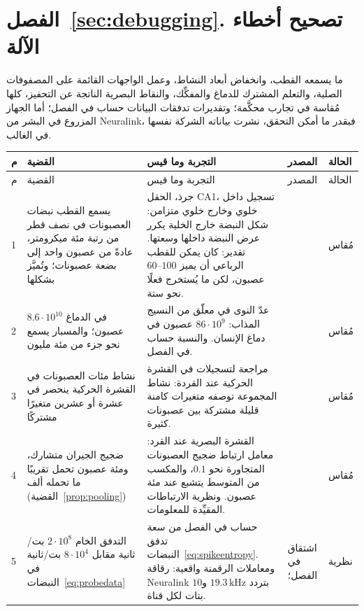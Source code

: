\section{الفصل~\ref{sec:debugging}. تصحيح أخطاء الآلة}

ما يسمعه القطب، وانخفاض أبعاد النشاط، وعمل الواجهات القائمة على المصفوفات الصلبة، والتعلم المشترك للدماغ والمفكِّك، والنقاط البصرية الناتجة عن التحفيز، كلها مُقاسة في تجارب محكَّمة؛ وتقديرات تدفقات البيانات حساب في الفصل؛ أما الجهاز المزروع في البشر من \foreignlanguage{english}{Neuralink}، فبقدر ما أمكن التحقق، نشرت بياناته الشركة نفسها في الغالب.

{\footnotesize
\setlength{\tabcolsep}{3pt}\renewcommand{\arraystretch}{1.15}
\begin{longtable}{>{\raggedright}p{0.5cm}>{\raggedright}p{4.0cm}>{\raggedright}p{5.6cm}>{\raggedright}p{2.3cm}>{\raggedright\arraybackslash}p{1.7cm}}
\toprule
م & القضية & التجربة وما قيس & المصدر & الحالة \\
\midrule\endfirsthead
\toprule
م & القضية & التجربة وما قيس & المصدر & الحالة \\
\midrule\endhead
1 & يسمع القطب نبضات العصبونات في نصف قطر من رتبة مئة ميكرومتر، عادةً من عصبون واحد إلى بضعة عصبونات؛ وتُميَّز بشكلها & جرذ، الحقل \foreignlanguage{english}{CA1}، تسجيل داخل خلوي وخارج خلوي متزامن: شكل النبضة خارج الخلية يكرر عرض النبضة داخلها وسعتها. تقدير: كان يمكن للقطب الرباعي أن يميز $60\text{--}100$ عصبون، لكن ما يُستخرج فعلًا نحو ستة. & \cite{Henze2000extra} & مُقاس \\
2 & في الدماغ $8.6\cdot10^{10}$ عصبون؛ والمسبار يسمع نحو جزء من مئة مليون & عدّ النوى في معلّق من النسيج المذاب: $86\cdot10^9$ عصبون في دماغ الإنسان. والنسبة حساب في الفصل. & \cite{Azevedo2009} & مُقاس \\
3 & نشاط مئات العصبونات في القشرة الحركية ينحصر في عشرة أو عشرين متغيرًا مشتركًا & مراجعة لتسجيلات في القشرة الحركية عند القردة: نشاط المجموعة توصفه متغيرات كامنة قليلة مشتركة بين عصبونات كثيرة. & \cite{Gallego2017} & مُقاس \\
4 & ضجيج الجيران متشارك، ومئة عصبون تحمل تقريبًا ما تحمله ألف (القضية~\ref{prop:pooling}) & القشرة البصرية عند القرد: معامل ارتباط ضجيج العصبونات المتجاورة نحو $0.1$، والمكسب من المتوسط يتشبع عند مئة عصبون. ونظرية الارتباطات المقيِّدة للمعلومات. & \cite{Zohary1994, MorenoBote2014} & مُقاس \\
5 & التدفق الخام $2\cdot10^8$ بت/ثانية مقابل $8\cdot10^4$ بت/ثانية في النبضات~\eqref{eq:probedata} & حساب في الفصل من سعة تدفق النبضات~\eqref{eq:spikeentropy}. ومعاملات الرقمنة واقعية: رقاقة \foreignlanguage{english}{Neuralink} بتردد $19.3\,\text{kHz}$ و$10$ بتات لكل قناة. & اشتقاق في الفصل؛ \cite{Rieke1997, Musk2019} & نظرية \\

\end{longtable}}
